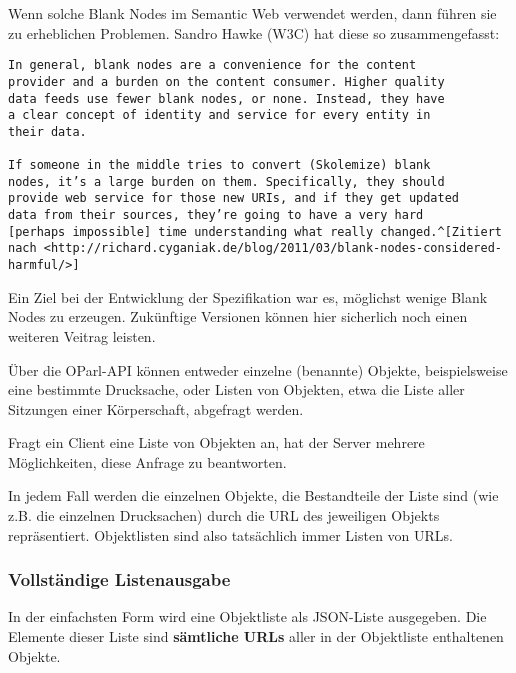 \documentclass[,a4paper]{article}
\begin{document}
Wenn solche Blank Nodes im Semantic Web verwendet werden, dann führen
sie zu erheblichen Problemen. Sandro Hawke (W3C) hat diese so
zusammengefasst:

\begin{verbatim}
In general, blank nodes are a convenience for the content
provider and a burden on the content consumer. Higher quality
data feeds use fewer blank nodes, or none. Instead, they have
a clear concept of identity and service for every entity in 
their data.

If someone in the middle tries to convert (Skolemize) blank 
nodes, it’s a large burden on them. Specifically, they should
provide web service for those new URIs, and if they get updated
data from their sources, they’re going to have a very hard
[perhaps impossible] time understanding what really changed.^[Zitiert
nach <http://richard.cyganiak.de/blog/2011/03/blank-nodes-considered-harmful/>]
\end{verbatim}

Ein Ziel bei der Entwicklung der Spezifikation war es, möglichst wenige
Blank Nodes zu erzeugen. Zukünftige Versionen können hier sicherlich
noch einen weiteren Veitrag leisten.


Über die OParl-API können entweder einzelne (benannte) Objekte,
beispielsweise eine bestimmte Drucksache, oder Listen von Objekten, etwa
die Liste aller Sitzungen einer Körperschaft, abgefragt werden.

Fragt ein Client eine Liste von Objekten an, hat der Server mehrere
Möglichkeiten, diese Anfrage zu beantworten.

In jedem Fall werden die einzelnen Objekte, die Bestandteile der Liste
sind (wie z.B. die einzelnen Drucksachen) durch die URL des jeweiligen
Objekts repräsentiert. Objektlisten sind also tatsächlich immer Listen
von URLs.

\subsubsection{Vollständige
Listenausgabe}\label{vollstuxe4ndige-listenausgabe}

In der einfachsten Form wird eine Objektliste als JSON-Liste ausgegeben.
Die Elemente dieser Liste sind \textbf{sämtliche URLs} aller in der
Objektliste enthaltenen Objekte.
\end{document}
